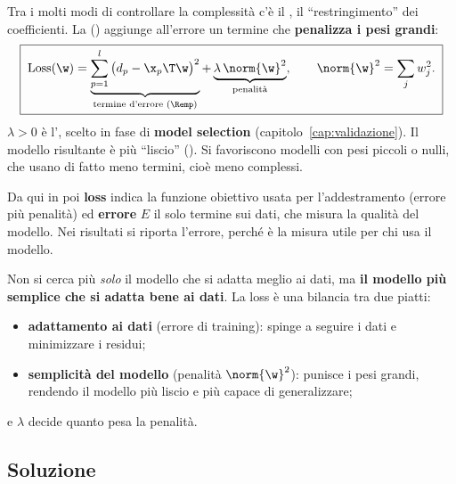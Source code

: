 Tra i molti modi di controllare la complessità c'è il , il ``restringimento'' dei
coefficienti. La  () aggiunge all'errore un
termine che \textbf{penalizza i pesi grandi}:
\begin{equation}\label{eq:ridge}
\boxed{\;\mathrm{Loss}(\w) = \underbrace{\sum_{p=1}^{l}\big(d_p - \x_p\T\w\big)^2}_{\text{termine d'errore }(\Remp)}
+ \underbrace{\lambda\,\norm{\w}^2}_{\text{penalità}},\qquad \norm{\w}^2 = \sum_j w_j^2 .\;}
\end{equation}
$\lambda>0$ è l', scelto in fase di \textbf{model selection}
(capitolo~\ref{cap:validazione}). Il modello risultante è più ``liscio'' (). Si favoriscono
modelli con pesi piccoli o nulli, che usano di fatto meno termini, cioè meno complessi.

\begin{attenzione}
Da qui in poi \textbf{loss} indica la funzione obiettivo usata per l'addestramento (errore più penalità) ed
\textbf{errore} $E$ il solo termine sui dati, che misura la qualità del modello. Nei risultati si riporta
l'errore, perché è la misura utile per chi usa il modello.
\end{attenzione}

\begin{idea}
Non si cerca più \emph{solo} il modello che si adatta meglio ai dati, ma \textbf{il modello più semplice che si
adatta bene ai dati}. La loss è una bilancia tra due piatti:
\begin{itemize}
  \item \textbf{adattamento ai dati} (errore di training): spinge a seguire i dati e minimizzare i residui;
  \item \textbf{semplicità del modello} (penalità $\norm{\w}^2$): punisce i pesi grandi, rendendo il modello più
        liscio e più capace di generalizzare;
\end{itemize}
e $\lambda$ decide quanto pesa la penalità.
\end{idea}

\subsection{Soluzione}

